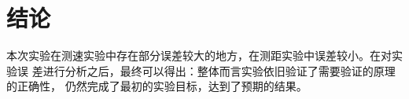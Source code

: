 \documentclass[../main]{subfiles}
\begin{document}
\chapter{结论}%
\label{cha:conclusion}

本次实验在测速实验中存在部分误差较大的地方，在测距实验中误差较小。在对实验误
差进行分析之后，最终可以得出：整体而言实验依旧验证了需要验证的原理的正确性，
仍然完成了最初的实验目标，达到了预期的结果。
\end{document}
